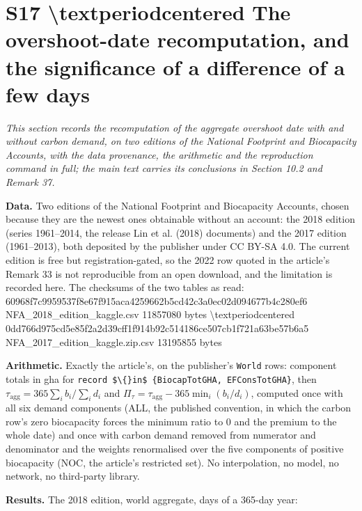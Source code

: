 \documentclass[11pt]{article}
\begin{document}
\section*{S17 \textbackslash{}textperiodcentered{} The overshoot-date recomputation, and the significance of a difference of a few days}\label{s17-textperiodcentered{}-the-overshoot-date-recomputation-and-the-sign}

\emph{This section records the recomputation of the aggregate overshoot date with and without carbon demand, on two editions of the National Footprint and Biocapacity Accounts, with the data provenance, the arithmetic and the reproduction command in full; the main text carries its conclusions in Section 10.2 and Remark 37.}

\textbf{Data.} Two editions of the National Footprint and Biocapacity Accounts, chosen because they are the newest ones obtainable without an account: the 2018 edition (series 1961--2014, the release Lin et al. (2018) documents) and the 2017 edition (1961--2013), both deposited by the publisher under CC BY-SA 4.0. The current edition is free but registration-gated, so the 2022 row quoted in the article's Remark 33 is not reproducible from an open download, and the limitation is recorded here. The checksums of the two tables as read: 60968f7c9959537f8e67f915aca4259662b5cd42c3a0ec02d094677b4c280ef6  NFA\_2018\_edition\_kaggle.csv  11857080 bytes \textbackslash{}textperiodcentered{} 0dd766d975cd5e85f2a2d39cff1f914b92c514186ce507cb1f721a63be57b6a5  NFA\_2017\_edition\_kaggle.zip.csv  13195855 bytes

\textbf{Arithmetic.} Exactly the article's, on the publisher's \texttt{World} rows: component totals in gha for \texttt{record \$\textbackslash\{\}in\$ \{BiocapTotGHA, EFConsTotGHA\}}, then \(\tau_{\mathrm{agg}} = 365\sum_i b_i/\sum_i d_i\) and \(\Pi_\tau = \tau_{\mathrm{agg}} - 365\min_i(b_i/d_i)\), computed once with all six demand components (ALL, the published convention, in which the carbon row's zero biocapacity forces the minimum ratio to 0 and the premium to the whole date) and once with carbon demand removed from numerator and denominator and the weights renormalised over the five components of positive biocapacity (NOC, the article's restricted set). No interpolation, no model, no network, no third-party library.

\textbf{Results.} The 2018 edition, world aggregate, days of a 365-day year:
\end{document}
